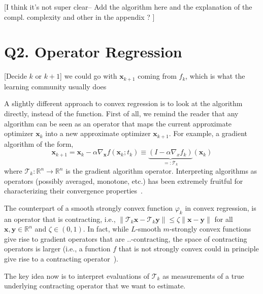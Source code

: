 \documentclass{article}
\newcommand{\R}{\mathbb{R}}
\newcommand{\x}{\mathbold{x}}
\newcommand{\y}{\mathbold{y}}
\newcommand{\T}{\mathcal{T}}
\newcommand{\nicola}[1]{{\color{blue}#1}}
\newcommand{\andrea}[1]{{\color{red}[#1]}}
\begin{document}
\andrea{I think it's not super clear-- Add the algorithm here and the explanation of the compl. complexity and other in the appendix ? }





\section{Q2. Operator Regression}\label{sec:opreg}

\andrea{Decide $k$ or $k+1$} \nicola{we could go with $\x_{k+1}$ coming from $f_k$, which is what the learning community usually does}

A slightly different approach to convex regression is to look at the algorithm directly, instead of the function. First of all, we remind the reader that any algorithm can be seen as an operator that maps the current approximate optimizer $\x_k$ into a new approximate optimizer $\x_{k+1}$. For example, a gradient algorithm of the form,
\begin{equation}
\x_{k+1} = \x_k - \alpha \nabla_{\x} f(\x_k; t_k) \equiv \underbrace{(I - \alpha \nabla_{x}f_k)}_{=:\T_k} (\x_k)
\end{equation}
where $\T_k: \R^n \to \R^n$ is the gradient algorithm operator. Interpreting algorithms as operators (possibly averaged, monotone, etc.) has been extremely fruitful for characterizing their convergence properties~\cite{Rockafellar1976, Eckstein1989, bauschke_convex_2017,Ryu2015,Sherson2018}.

The counterpart of a smooth strongly convex function $\varphi_k$ in convex regression, is an operator that is contracting, i.e., $\|\T_k \x - \T_k \y\| \leq \zeta \|\x - \y\|$ for all $\x, \y \in \R^n$ and $\zeta \in (0,1)$. In fact, while $L$-smooth $m$-strongly convex functions give rise to gradient operators that are $..$-contracting, the space of contracting operators is larger (i.e., a function $f$ that is not strongly convex could in principle give rise to a contracting operator~\cite{linear}). 

The key idea now is to interpret evaluations of $\T_k$ as measurements of a true underlying contracting operator that we want to estimate. 
 
\end{document}
